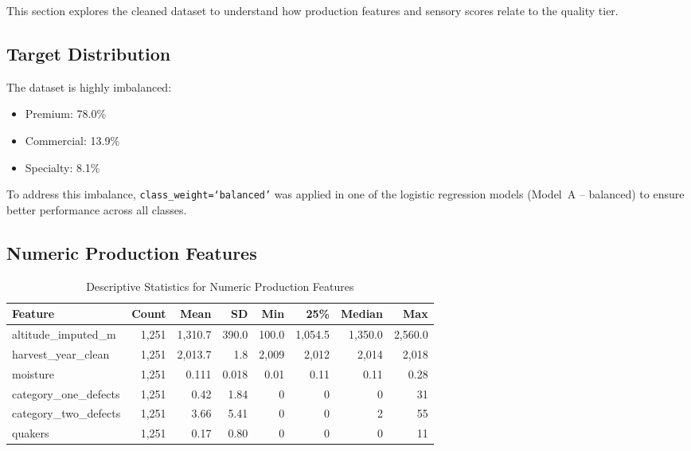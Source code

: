 \documentclass[12pt, a4paper]{article}
\begin{document}
This section explores the cleaned dataset to understand how production features and sensory scores
relate to the quality tier.

\subsection{Target Distribution}

The dataset is highly imbalanced:
\begin{itemize}
  \item Premium: 78.0\%
  \item Commercial: 13.9\%
  \item Specialty: 8.1\%
\end{itemize}

To address this imbalance, \texttt{class\_weight=`balanced'} was applied in one of the logistic
regression models (Model~A -- balanced) to ensure better performance across all classes.

\subsection{Numeric Production Features}

\begin{table}[H]
  \centering
  \caption{Descriptive Statistics for Numeric Production Features}
  \begin{tabular}{lrrrrrrr}
    \toprule
    \textbf{Feature} & \textbf{Count} & \textbf{Mean} & \textbf{SD}
      & \textbf{Min} & \textbf{25\%} & \textbf{Median} & \textbf{Max} \\
    \midrule
    altitude\_imputed\_m   & 1,251 & 1,310.7 & 390.0 & 100.0  & 1,054.5 & 1,350.0 & 2,560.0 \\
    harvest\_year\_clean   & 1,251 & 2,013.7 &   1.8 & 2,009  & 2,012   & 2,014   & 2,018   \\
    moisture               & 1,251 &   0.111 & 0.018 &   0.01 &   0.11  &   0.11  &   0.28  \\
    category\_one\_defects & 1,251 &    0.42 &  1.84 &   0    &   0     &   0     &  31     \\
    category\_two\_defects & 1,251 &    3.66 &  5.41 &   0    &   0     &   2     &  55     \\
    quakers                & 1,251 &    0.17 &  0.80 &   0    &   0     &   0     &  11     \\
    \bottomrule
  \end{tabular}
\end{table}
\end{document}
